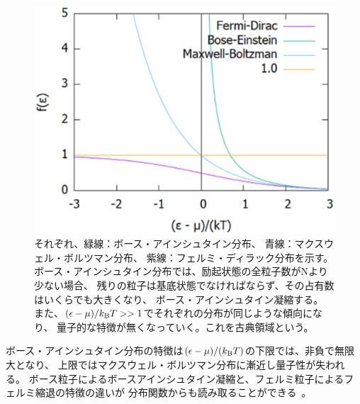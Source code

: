 \documentclass[12pt,a4paper]{jbook}
\newcommand{\kb} {k_{\rm B}}				%
\begin{document}
		\begin{figure}[H]
			\centering
			\includegraphics[width=14cm]{dist.eps}
			\caption{
			それぞれ、緑線：ボース・アインシュタイン分布、
			青線：マクスウェル・ボルツマン分布、
			紫線：フェルミ・ディラック分布を示す。
            ボース・アインシュタイン分布では、励起状態の全粒子数がNより少ない場合、
            残りの粒子は基底状態でなければならず、その占有数はいくらでも大きくなり、
            ボース・アインシュタイン凝縮する。
            また、$(\epsilon - \mu)/{\kb T}>>1$でそれぞれの分布が同じような傾向になり、
            量子的な特徴が無くなっていく。これを古典領域という。
			}
			\label{FIG:bose}
		\end{figure}
		ボース・アインシュタイン分布の特徴は$(\epsilon - \mu) / (\kb T)$の下限では、非負で無限大となり、
        上限ではマクスウェル・ボルツマン分布に漸近し量子性が失われる。
        ボース粒子によるボースアインシュタイン凝縮と、フェルミ粒子によるフェルミ縮退の特徴の違いが
        分布関数からも読み取ることができる~\cite{Pauli}。
\end{document}
